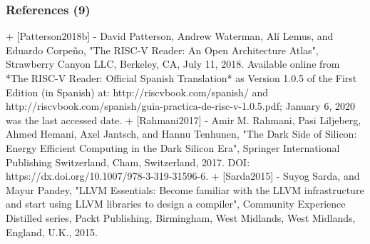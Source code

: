 \documentclass[xcolor={usenames,dvipsnames},hyperref={hyperindex,bookmarks}]{beamer}
\begin{document}
\begin{frame}
	\frametitle{References (9)}


+ [Patterson2018b]
	- David Patterson, Andrew Waterman, Al{\'{i}} Lemus, and Eduardo Corpe{\~{n}}o, "The {RISC-V} Reader: An Open Architecture Atlas", Strawberry Canyon {LLC}, Berkeley, {CA}, July 11, 2018. Available online from *The {RISC-V} Reader: Official Spanish Translation* as Version 1.0.5 of the First Edition (in Spanish) at: http://riscvbook.com/spanish/ and http://riscvbook.com/spanish/guia-practica-de-risc-v-1.0.5.pdf; January 6, 2020 was the last accessed date.
+ [Rahmani2017]
	- Amir M. Rahmani, Pasi Liljeberg, Ahmed Hemani, Axel Jantsch, and Hannu Tenhunen, "The Dark Side of Silicon: Energy Efficient Computing in the Dark Silicon Era", Springer International Publishing Switzerland, Cham, Switzerland, 2017. DOI: https://dx.doi.org/10.1007/978-3-319-31596-6.
+ [Sarda2015]
	- Suyog Sarda, and Mayur Pandey, "{LLVM} Essentials: Become familiar with the {LLVM} infrastructure and start using {LLVM} libraries to design a compiler", Community Experience Distilled series, Packt Publishing, Birmingham, West Midlands, West Midlands, England, {U.K.}, 2015.



\end{frame}
\end{document}
